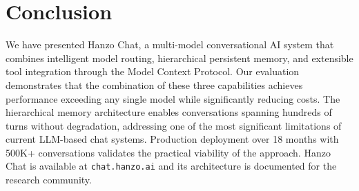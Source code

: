 \section{Conclusion}

\label{sec:conclusion}

We have presented Hanzo Chat, a multi-model conversational AI system that combines intelligent model routing, hierarchical persistent memory, and extensible tool integration through the Model Context Protocol. Our evaluation demonstrates that the combination of these three capabilities achieves performance exceeding any single model while significantly reducing costs. The hierarchical memory architecture enables conversations spanning hundreds of turns without degradation, addressing one of the most significant limitations of current LLM-based chat systems. Production deployment over 18 months with 500K+ conversations validates the practical viability of the approach. Hanzo Chat is available at \texttt{chat.hanzo.ai} and its architecture is documented for the research community.

